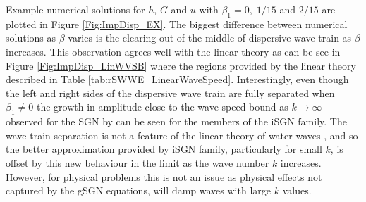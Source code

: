 \documentclass[10pt]{elsarticle}
\begin{document}
Example numerical solutions for $h$, $G$ and $u$ with $\beta_1 = 0,\;1/15$ and $2/15 $ are plotted in Figure \ref{Fig:ImpDisp_EX}. The biggest difference between numerical solutions as $\beta$ varies is the clearing out of the middle of dispersive wave train as $\beta$ increases. This observation agrees well with the linear theory as can be see in Figure \ref{Fig:ImpDisp_LinWVSB} where the regions provided by the linear theory described in Table \ref{tab:rSWWE_LinearWaveSpeed}. Interestingly, even though the left and right sides of the dispersive wave train are fully separated when $\beta_1 \neq 0$  the growth in amplitude close to the wave speed bound as $k \rightarrow \infty$ observed for the SGN by \citet{Pitt-2018-61} can be seen for the members of the iSGN family. The wave train separation is not a feature of the linear theory of water waves \cite{Whitham-1967-399}, and so the better approximation provided by iSGN family, particularly for small $k$, is offset by this new behaviour in the limit as the wave number $k$ increases. However, for physical problems this is not an issue as physical effects not captured by the gSGN equations, will damp waves with large $k$ values.  
%
\end{document}
